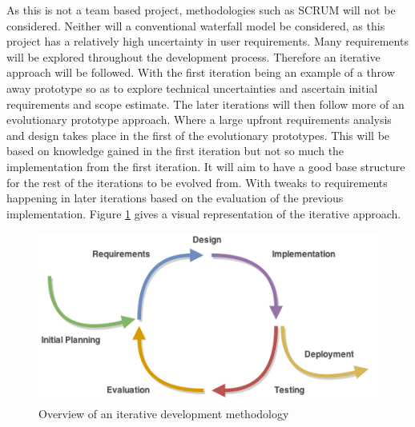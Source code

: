 \documentclass[11pt,oneside]{report}
\begin{document}
					As this is not a team based project, methodologies such as SCRUM will not be considered.
					Neither will a conventional waterfall model be considered, as this project has a relatively high uncertainty in user requirements.
					Many requirements will be explored throughout the development process.
					Therefore an iterative approach will be followed.
					With the first iteration being an example of a throw away prototype so as to explore technical uncertainties and ascertain initial requirements and scope estimate.
					The later iterations will then follow more of an evolutionary prototype approach.
					Where a large upfront requirements analysis and design takes place in the first of the evolutionary prototypes.
					This will be based on knowledge gained in the first iteration but not so much the implementation from the first iteration.
					It will aim to have a good base structure for the rest of the iterations to be evolved from.
					With tweaks to requirements happening in later iterations based on the evaluation of the previous implementation.
					Figure \ref{fig:iterative} gives a visual representation of the iterative approach.
					\begin{figure}[!h]
						\begin{center}
					
    						\includegraphics[width=\textwidth]{iterative_development}
    						\caption{Overview of an iterative development methodology {\label{fig:iterative}}}
    					\end{center}
					\end{figure}
\end{document}
